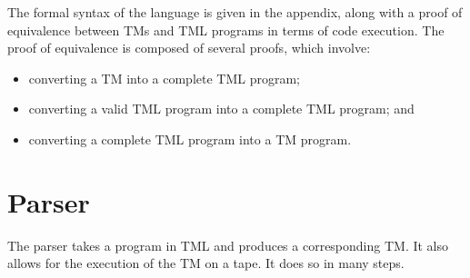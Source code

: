 The formal syntax of the language is given in the appendix, along with a proof of equivalence between TMs and TML programs in terms of code execution. The proof of equivalence is composed of several proofs, which involve:
\begin{itemize}
    \item converting a TM into a complete TML program;
    \item converting a valid TML program into a complete TML program; and
    \item converting a complete TML program into a TM program.
\end{itemize}




\section{Parser}
The parser takes a program in TML and produces a corresponding TM. It also allows for the execution of the TM on a tape. It does so in many steps.

